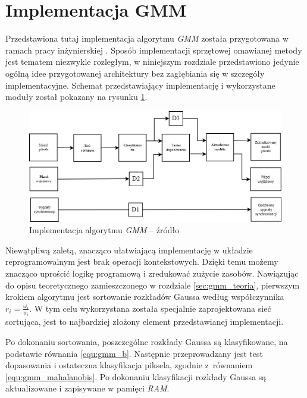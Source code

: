 \section{Implementacja GMM}
\label{sec:fpga_gmm}

Przedstawiona tutaj implementacja algorytmu \textit{GMM} została przygotowana w ramach pracy inżynierskiej \cite{piszczek_15}. Sposób implementacji sprzętowej omawianej metody jest tematem niezwykle rozległym, w niniejszym rozdziale przedstawiono jedynie ogólną idee przygotowanej architektury bez zagłębiania się w szczegóły implementacyjne. Schemat przedstawiający implementację i wykorzystane moduły został pokazany na rysunku \ref{fig:gmm_diagram}.

	\begin{figure}[h!]
		\centering
		\includegraphics[scale=0.45]{img/4/gmm.png}
		\caption{Implementacja algorytmu \textit{GMM} -- źródło \cite{piszczek_15}}
		\label{fig:gmm_diagram}
	\end{figure}
	
Niewątpliwą zaletą, znacząco ułatwiającą implementację w układzie reprogramowalnym jest brak operacji kontekstowych. Dzięki temu możemy znacząco uprościć logikę programową i zredukować zużycie zasobów. Nawiązując do opisu teoretycznego zamieszczonego w rozdziale \ref{sec:gmm_teoria}, pierwszym krokiem algorytmu jest sortowanie rozkładów Gaussa według współczynnika $r_i = \frac{\omega_i}{\sigma_i}$. W tym celu wykorzystana została specjalnie zaprojektowana sieć sortująca, jest to najbardziej złożony element przedstawianej implementacji. 

Po dokonaniu sortowania, poszczególne rozkłady Gaussa są klasyfikowane, na podstawie równania \ref{equ:gmm_b}. Następnie przeprowadzany jest test dopasowania i ostateczna klasyfikacja piksela, zgodnie z~równaniem \ref{equ:gmm_mahalanobis}. Po dokonaniu klasyfikacji rozkłady Gaussa są aktualizowane i zapisywane w pamięci \textit{RAM}.

